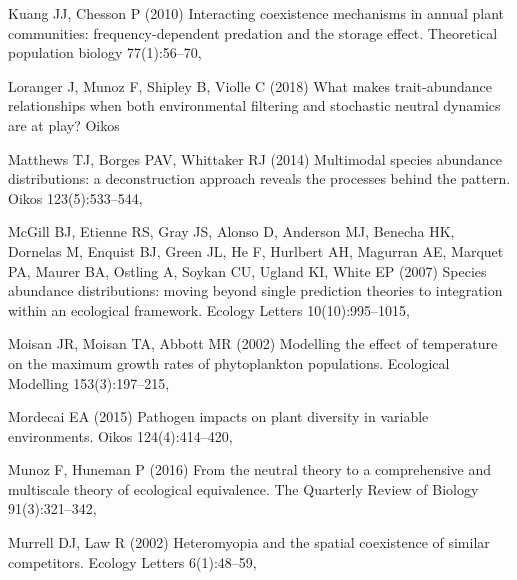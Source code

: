 \documentclass[a4paper,12pt]{article}
\begin{document}
\begin{thebibliography}{56}
Kuang JJ, Chesson P (2010) Interacting coexistence mechanisms in annual plant
  communities: frequency-dependent predation and the storage effect.
  Theoretical population biology 77(1):56--70, 

Loranger J, Munoz F, Shipley B, Violle C (2018) What makes trait-abundance
  relationships when both environmental filtering and stochastic neutral
  dynamics are at play? Oikos 

Matthews TJ, Borges PAV, Whittaker RJ (2014) Multimodal species abundance
  distributions: a deconstruction approach reveals the processes behind the
  pattern. Oikos 123(5):533--544, 

McGill BJ, Etienne RS, Gray JS, Alonso D, Anderson MJ, Benecha HK, Dornelas M,
  Enquist BJ, Green JL, He F, Hurlbert AH, Magurran AE, Marquet PA, Maurer BA,
  Ostling A, Soykan CU, Ugland KI, White EP (2007) Species abundance
  distributions: moving beyond single prediction theories to integration within
  an ecological framework. Ecology Letters 10(10):995--1015,

Moisan JR, Moisan TA, Abbott MR (2002) Modelling the effect of temperature on
  the maximum growth rates of phytoplankton populations. Ecological Modelling
  153(3):197--215, 

Mordecai EA (2015) Pathogen impacts on plant diversity in variable
  environments. Oikos 124(4):414--420, 

Munoz F, Huneman P (2016) From the neutral theory to a comprehensive and
  multiscale theory of ecological equivalence. The Quarterly Review of Biology
  91(3):321--342, 

Murrell DJ, Law R (2002) Heteromyopia and the spatial coexistence of similar
  competitors. Ecology Letters 6(1):48--59,


\end{thebibliography}
\end{document}
